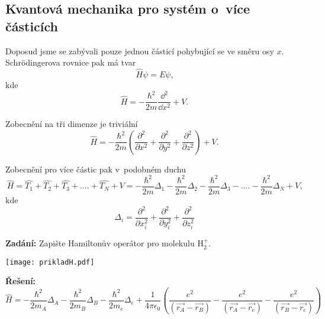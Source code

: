 \subsection{Kvantová mechanika pro systém o~více částicích}

Doposud jsme se zabývali pouze jednou částicí pohybující se ve směru osy $x$. Schr\"odingerova rovnice pak má tvar
\begin{equation}
\hat{H}\psi = E\psi \mbox{,}
\label{rov:Vicecastic1}
\end{equation}
kde
\begin{equation}
\hat{H} = -\frac{\hbar^2}{2m}\frac{\dd ^2}{\dd x^2} + V{.}
\label{rov:Vicecastic2}
\end{equation}

\noindent Zobecnění na tři dimenze je triviální
\begin{equation}
\hat{H} = -\frac{\hbar^2}{2m}\left( \frac{\partial^2}{\partial x^2} + \frac{\partial^2}{\partial y^2} + \frac{\partial^2}{\partial z^2} \right ) + V \mbox{.}
\label{rov:Vicecastic3}
\end{equation}

\noindent Zobecnění pro více částic pak v~podobném duchu
\begin{equation}
\hat{H} = \hat{T_1} + \hat{T_2} + \hat{T_3} + .... + \hat{T_N} + V = -\frac{\hbar^2}{2m}\Delta_1 - \frac{\hbar^2}{2m}\Delta_2 - \frac{\hbar^2}{2m}\Delta_3 - .... - \frac{\hbar^2}{2m}\Delta_N + V \mbox{,}
\label{rov:Vicecastic4}
\end{equation}
kde
\begin{equation}
\Delta_i = \frac{\partial^2}{\partial x_i^2} + \frac{\partial^2}{\partial y_i^2} + \frac{\partial^2}{\partial z_i^2}
\label{rov:Vicecastic5}
\end{equation}

\begin{priklad}
\textbf{Zadání:}  Zapište Hamiltonův operátor pro molekulu H$_2^{+}$.

\begin{center}
\texttt{[image: prikladH.pdf]}

\end{center}

\textbf{Řešení:}
\begin{equation}
\hat{H} = -\frac{\hbar ^2}{2m_A} \Delta _A - \frac{\hbar^2}{2m_B}\Delta _B -\frac{\hbar^2}{2m_e}\Delta _e + \frac{1}{4\pi \epsilon _0} \left( \frac{e^2}{(\vec{r_A} - \vec{r_B})} - \frac{e^2}{(\vec{r_A} - \vec{r_e})}  - \frac{e^2}{(\vec{r_B} - \vec{r_e})} \right)
\nonumber
\label{rov:Vicecastic6}
\end{equation}

\end{priklad}





